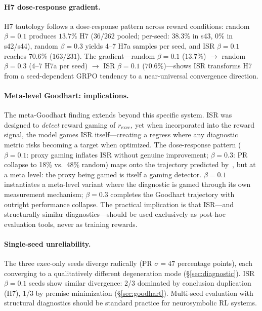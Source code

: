 \paragraph{H7 dose-response gradient.}
H7 tautology follows a dose-response pattern across reward conditions: random $\beta{=}0.1$ produces $13.7\%$ H7 ($36/262$ pooled; per-seed: $38.3\%$ in s43, $0\%$ in s42/s44), random $\beta{=}0.3$ yields 4--7 H7a samples per seed, and ISR $\beta{=}0.1$ reaches $70.6\%$ ($163/231$).
The gradient---random $\beta{=}0.1$ ($13.7\%$) $\to$ random $\beta{=}0.3$ (4--7 H7a per seed) $\to$ ISR $\beta{=}0.1$ ($70.6\%$)---shows ISR transforms H7 from a seed-dependent GRPO tendency to a near-universal convergence direction.

\paragraph{Meta-level Goodhart: implications.}
The meta-Goodhart finding extends beyond this specific system.
ISR was designed to \emph{detect} reward gaming of $r_{\text{exec}}$, yet when incorporated into the reward signal, the model games ISR itself---creating a regress where any diagnostic metric risks becoming a target when optimized.
The dose-response pattern ($\beta{=}0.1$: proxy gaming inflates ISR without genuine improvement; $\beta{=}0.3$: PR collapse to 18\% vs.\ 48\% random) maps onto the trajectory predicted by~\citet{gao-reward-overoptimization}, but at a meta level: the proxy being gamed is itself a gaming detector.
$\beta{=}0.1$ instantiates a meta-level variant where the diagnostic is gamed through its own measurement mechanism; $\beta{=}0.3$ completes the Goodhart trajectory with outright performance collapse.
The practical implication is that ISR---and structurally similar diagnostics---should be used exclusively as post-hoc evaluation tools, never as training rewards.

\paragraph{Single-seed unreliability.}
The three exec-only seeds diverge radically (PR $\sigma{=}47$ percentage points), each converging to a qualitatively different degeneration mode (\S\ref{sec:diagnostic}).
ISR $\beta{=}0.1$ seeds show similar divergence: 2/3 dominated by conclusion duplication (H7), 1/3 by premise minimization (\S\ref{sec:goodhart}).
Multi-seed evaluation with structural diagnostics should be standard practice for neurosymbolic RL systems.


